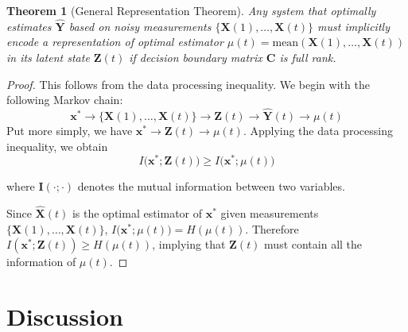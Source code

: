 \documentclass[12pt]{article}
\newtheorem{theorem}{Theorem}
\begin{document}
\begin{theorem}[General Representation Theorem]
\label{thm:data_proc_ineq}
    Any system that optimally estimates $\hat{\mathbf Y}$ based on noisy measurements $\{\mathbf X(1), \dots, \mathbf X(t)\}$ must implicitly encode a representation of optimal estimator $\mu(t) = \text{mean}(\mathbf X(1), \dots, \mathbf X(t))$ in its latent state $\mathbf Z(t)$ if decision boundary matrix $\mathbf C$ is full rank. 
\end{theorem}

\begin{proof}
	This follows from the data processing inequality. We  begin with the following Markov chain: 
	\begin{equation}
		\mathbf x^* \to \{\mathbf X(1), \dots, \mathbf X(t)\} \to \mathbf{Z}(t) \to \hat{\mathbf{Y}}(t) \to \mu(t) 
	\end{equation}
    Put more simply, we have $\mathbf x^* \to \mathbf Z(t) \to \mu(t)$. 
    Applying the data processing inequality, we obtain 
    \begin{equation}
        \label{eqn:data_proc_ineq}
        I\big( \mathbf x^*; \mathbf Z(t) \big) \geq I\big( \mathbf x^*;  \mu (t) \big)
    \end{equation}

    where $\mathbf I(\cdot; \cdot)$ denotes the mutual information between two variables. 

    Since $\hat{\mathbf X}(t)$ is the optimal estimator of $\mathbf x^*$ given measurements $\{\mathbf X(1), \dots, \mathbf X(t)\}$, $I\big( \mathbf x^*;  \mu(t) \big) = H(\mu(t))$. 
    Therefore $I(\mathbf x^*; \mathbf Z(t) ) \geq H(\mu(t))$, implying that $\mathbf Z(t)$ must contain all the information of $\mu(t)$. 
\end{proof}



\section{Discussion} 
\label{app:theory_discussion}
\end{document}
